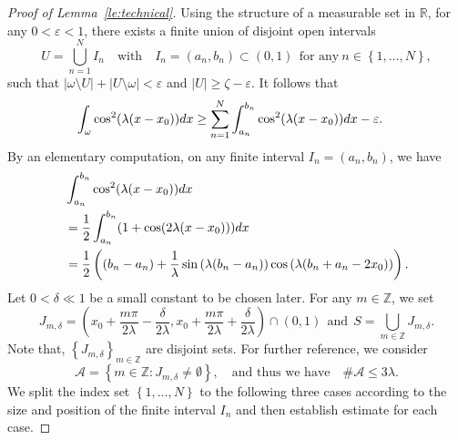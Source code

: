 \documentclass[10pt,a4paper]{amsart}
\newcommand{\R}{\mathbb{R}}
\def \d {{\rm{d}}}
\begin{document}
\begin{proof}[Proof of Lemma~\ref{le:technical}]
Using the structure of a measurable set in $\R$, for any $0<\varepsilon<1$, there exists a finite union of disjoint open intervals 
\begin{equation*}
    U=\bigcup\limits_{n=1}^{N}I_{n}\quad \mbox{with}\quad 
    I_{n}=(a_{n},b_{n})\subset (0,1) \  \ \mbox{for any}\ n\in \left\{1,\dots,N\right\},
    \end{equation*}
    such that $|\omega \setminus U|+|U\setminus \omega |<\varepsilon$ and $|U|\ge \zeta-\varepsilon$.
    It follows that 
    \begin{equation}\label{est:cos2}
    \begin{aligned}
       \int_{\omega}\cos^{2}(\lambda(x-x_{0}))\d x
       &\ge 
       \sum_{n=1}^{N}\int_{a_{n}}^{b_{n}}\cos^{2}(\lambda(x-x_{0}))\d x-\varepsilon.
       \end{aligned}
        \end{equation}
By an elementary computation, on any finite interval $I_{n}=(a_{n},b_{n})$, we have 
\begin{equation}\label{est:ajbj}
\begin{aligned}
    &\int_{a_{n}}^{b_{n}}\cos^{2}(\lambda(x-x_{0}))\d x\\
    &=\frac{1}{2}\int_{a_{n}}^{b_{n}}(1+\cos (2\lambda(x-x_{0})))\d x\\
    &=\frac{1}{2}\left((b_{n}-a_{n})+\frac{1}{\lambda}\sin \left(\lambda(b_{n}-a_{n})\right)\cos \left(\lambda(b_{n}+a_{n}-2x_{0})\right)\right).
    \end{aligned}
    \end{equation}
Let $0<\delta\ll 1$ be a small constant to be chosen later. For any $m\in \mathbb{Z}$, we set 
\begin{equation*}
    J_{m,\delta}=\left(x_{0}+\frac{m \pi }{2\lambda}-\frac{\delta}{2\lambda},x_{0}+\frac{m \pi }{2\lambda}+\frac{\delta}{2\lambda}\right)\cap (0,1)\ \ \mbox{and}\  \ S=\bigcup\limits_{m\in \mathbb{Z}}J_{m,\delta}.
    \end{equation*}
Note that, $\left\{J_{m,\delta}\right\}_{m\in \mathbb{Z}}$ are disjoint sets.
For further reference, we consider
\begin{equation*}
    \mathcal{A}=\left\{m\in \mathbb{Z}:J_{m,\delta}\ne \emptyset\right\},\quad \mbox{and thus we have}\quad  \# \mathcal{A}\le 3\lambda.
\end{equation*}
We split the index set $\left\{1,\dots,N\right\}$ to the following three cases according to the size and position of the finite interval $I_{n}$ and then establish estimate for each case.


\end{proof}
\end{document}

